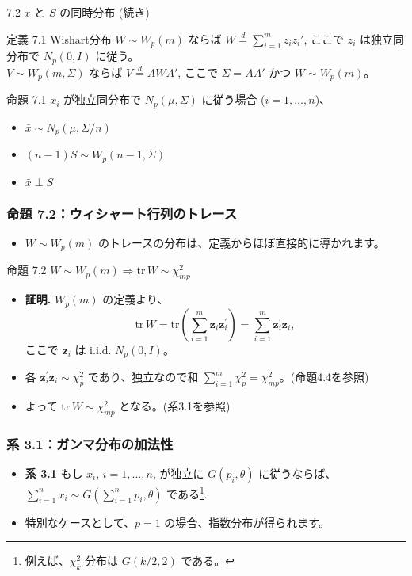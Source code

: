 \documentclass[aspectratio=169]{beamer}
\begin{document}
\begin{frame}{7.2 $\bar{x}$ と $S$ の同時分布 (続き)}
\begin{block}{定義 7.1 Wishart分布}
$W \sim W_p(m)$ ならば $W \overset{d}{=} \sum_{i=1}^{m} z_i z_i'$, ここで $z_i$ は独立同分布で $N_p(0, I)$ に従う。\\
$V \sim W_p(m, \Sigma)$ ならば $V \overset{d}{=} AWA'$, ここで $\Sigma=AA'$ かつ $W \sim W_p(m)$。
\end{block}

\begin{block}{命題 7.1}
$x_i$ が独立同分布で $N_p(\mu, \Sigma)$ に従う場合 ($i=1, \dots, n$)、
\begin{itemize}
    \item $\bar{x} \sim N_p(\mu, \Sigma/n)$ 
    \item $(n-1)S \sim W_p(n-1, \Sigma)$ 
    \item $\bar{x} \perp S$ 
\end{itemize}
\end{block}
\end{frame}

\begin{frame}
\frametitle{命題 7.2：ウィシャート行列のトレース}
\begin{itemize}
    \item $W\sim W_p(m)$ のトレースの分布は、定義からほぼ直接的に導かれます。
\end{itemize}
\begin{block}{命題 7.2} 
    $W\sim W_p(m)\Rightarrow \mathrm{tr}\,W\sim\chi^2_{mp}$
\end{block}
\begin{itemize}
    \item \textbf{証明.} $W_p(m)$ の定義より、
    \[
    \mathrm{tr}\,W = \mathrm{tr}\left(\sum_{i=1}^{m}\bm{z}_{i}\bm{z}_{i}^{\prime}\right) = \sum_{i=1}^{m}\bm{z}_{i}^{\prime}\bm{z}_{i},
    \]
    ここで $\bm{z}_i$ は i.i.d. $N_p(0, I)$。
    \item 各 $\bm{z}_i^{\prime}\bm{z}_i \sim \chi_p^2$ であり、独立なので和 $\sum_{i=1}^m \chi_p^2 = \chi_{mp}^2$。(命題4.4を参照)
    \item よって $\mathrm{tr}\,W \sim \chi_{mp}^2$ となる。(系3.1を参照)
\end{itemize}
\end{frame}

\begin{frame}
\frametitle{系 3.1：ガンマ分布の加法性}
\begin{itemize}
    \item \textbf{系 3.1} もし $x_i$, $i=1,...,n$, が独立に $G(p_i, \theta)$ に従うならば、$\sum_{i=1}^{n}x_i \sim G\left(\sum_{i=1}^{n}p_i, \theta\right)$ である\footnote{例えば、$\chi^2_k$ 分布は $G(k/2, 2)$ である。}.
    \item 特別なケースとして、$p=1$ の場合、指数分布が得られます。
\end{itemize}
\end{frame}
\end{document}
